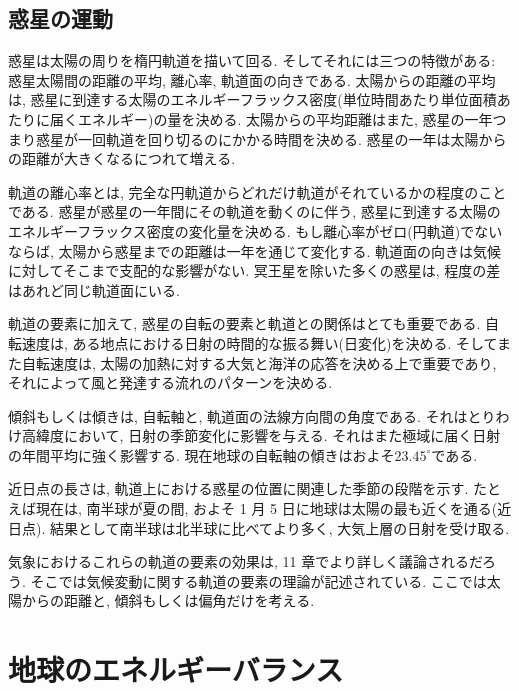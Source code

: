 \documentclass[a4j,12pt,openbib,oneside,dvipdfmx]{jbook}
\begin{document}
\subsection{惑星の運動}
\par
惑星は太陽の周りを楕円軌道を描いて回る. そしてそれには三つの特徴がある: 惑星太陽間の距離の平均, 離心率, 軌道面の向きである. 太陽からの距離の平均は, 惑星に到達する太陽のエネルギーフラックス密度(単位時間あたり単位面積あたりに届くエネルギー)の量を決める. 太陽からの平均距離はまた, 惑星の一年つまり惑星が一回軌道を回り切るのにかかる時間を決める. 惑星の一年は太陽からの距離が大きくなるにつれて増える.
\par
軌道の離心率とは, 完全な円軌道からどれだけ軌道がそれているかの程度のことである. 惑星が惑星の一年間にその軌道を動くのに伴う, 惑星に到達する太陽のエネルギーフラックス密度の変化量を決める. 
もし離心率がゼロ(円軌道)でないならば, 太陽から惑星までの距離は一年を通じて変化する. 軌道面の向きは気候に対してそこまで支配的な影響がない. 冥王星を除いた多くの惑星は, 程度の差はあれど同じ軌道面にいる.
\par
軌道の要素に加えて, 惑星の自転の要素と軌道との関係はとても重要である. 自転速度は, ある地点における日射の時間的な振る舞い(日変化)を決める. 
そしてまた自転速度は, 太陽の加熱に対する大気と海洋の応答を決める上で重要であり, それによって風と発達する流れのパターンを決める.
\par
傾斜もしくは傾きは, 自転軸と, 軌道面の法線方向間の角度である. それはとりわけ高緯度において, 日射の季節変化に影響を与える. それはまた極域に届く日射の年間平均に強く影響する. 現在地球の自転軸の傾きはおよそ$23.45^\circ$である.
\par
近日点の長さは, 軌道上における惑星の位置に関連した季節の段階を示す. たとえば現在は, 南半球が夏の間, およそ 1 月 5 日に地球は太陽の最も近くを通る(近日点). 結果として南半球は北半球に比べてより多く, 大気上層の日射を受け取る.
\par
気象におけるこれらの軌道の要素の効果は, 11 章でより詳しく議論されるだろう. そこでは気候変動に関する軌道の要素の理論が記述されている. ここでは太陽からの距離と, 傾斜もしくは偏角だけを考える.

\newpage
\section{地球のエネルギーバランス}
\end{document}
